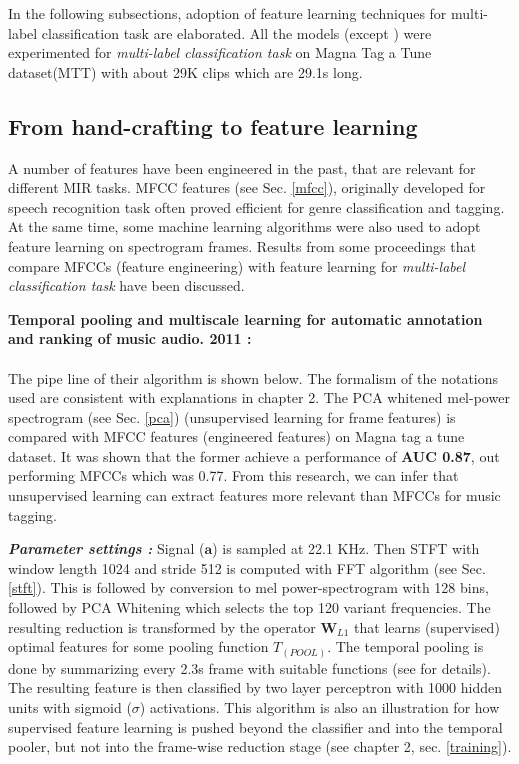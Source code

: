 \noindent In the following subsections, adoption of feature learning techniques for multi-label classification task are elaborated. All the models (except \cite{MusicMotive}) were experimented for \textit{multi-label classification task} on Magna Tag a Tune dataset(MTT)\cite{MTT} with about 29K clips which are 29.1s long.

\subsection{From hand-crafting to feature learning}
\label{featurelearning}
A number of features have been engineered in the past, that are relevant for different MIR tasks. MFCC features (see Sec. \ref{mfcc}), originally developed for speech recognition task often proved efficient for genre classification and tagging. At the same time, some machine learning algorithms were also used to adopt feature learning on spectrogram frames. Results from some proceedings that compare MFCCs (feature engineering) with feature learning for \textit{multi-label classification task} have been discussed.
\bigskip

\noindent \textbf{Temporal pooling and multiscale learning for automatic annotation and ranking of music audio. 2011 \cite{featurelearn1}:}\\
\\
\noindent The pipe line of their algorithm is shown below. The formalism of the notations used are consistent with explanations in chapter 2. The PCA whitened mel-power spectrogram (see Sec. \ref{pca}) (unsupervised learning for frame features) is compared with MFCC features (engineered features) on Magna tag a tune dataset. It was shown that the former achieve a performance of \textbf{AUC 0.87}, out performing MFCCs which was 0.77. From this research, we can infer that unsupervised learning can extract features more relevant than MFCCs for music tagging.  
\bigskip

\noindent \textbf{\textit{Parameter settings :}} Signal ($\textbf{a}$) is sampled at 22.1 KHz. Then STFT with window length 1024 and stride 512 is computed with FFT algorithm (see Sec. \ref{stft}). This is followed by conversion to mel power-spectrogram with 128 bins, followed by PCA Whitening which selects the top 120 variant frequencies. The resulting reduction is transformed by the operator $\textbf{W}_{L1}$ that learns (supervised) optimal features for some pooling function $T_{(POOL)}$. The temporal pooling is done by summarizing every 2.3s frame with suitable functions (see \cite{featurelearn1} for details). The resulting feature is then classified by two layer perceptron with 1000 hidden units with sigmoid ($\sigma$) activations. This algorithm is also an illustration for how supervised feature learning is pushed beyond the classifier and into the temporal pooler, but not into the frame-wise reduction stage (see chapter 2, sec. \ref{training}).

